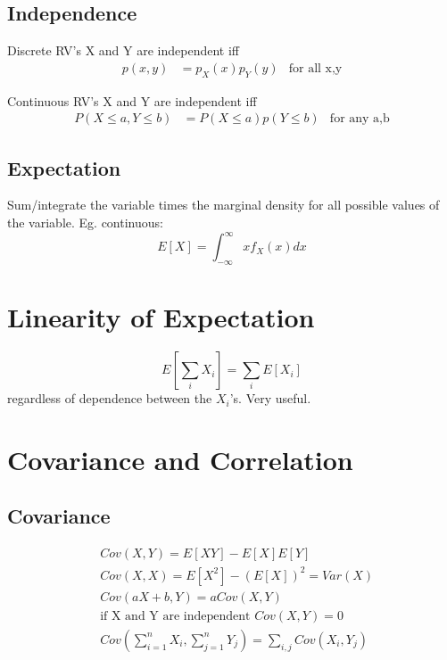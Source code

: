 \documentclass[12pt]{amsart}
\begin{document}
\subsection{Independence}
Discrete RV's X and Y are independent iff
\begin{align*}
p(x,y) &= p_X(x)p_Y(y) & \text{for all x,y}
\end{align*}

Continuous RV's X and Y are independent iff
\begin{align*}
P(X \leq a, Y \leq b) &= P(X\leq a)p(Y \leq b) & \text{for any a,b}
\end{align*}

\subsection{Expectation}
Sum/integrate the variable times the marginal density for all possible values of the variable. Eg. continuous:
\[
E[X] = \int_{-\infty}^{\infty} xf_X(x) dx
\]
\section{Linearity of Expectation}
\[
E\left[\sum_i X_i\right] = \sum_i E[X_i]
\]
regardless of dependence between the $X_i$'s. Very useful.
\section{Covariance and Correlation}
\subsection{Covariance}
\begin{align*}
&Cov(X,Y) = E[XY] - E[X]E[Y] \\
&Cov(X,X) = E[X^2] - (E[X])^2 = Var(X) \\
&Cov(aX+b, Y) = a Cov(X,Y)\\
&\text{if X and Y are independent } Cov(X,Y)=0 \\
&Cov \left(\sum_{i=1}^n X_i, \sum_{j=1}^n Y_j\right) = \sum_{i,j} Cov(X_i, Y_j)
\end{align*}
\end{document}
